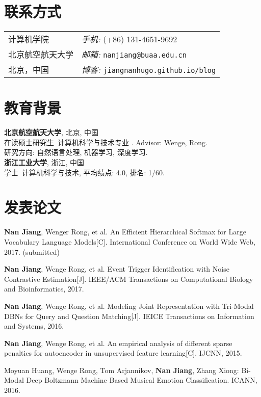 \documentclass[margin,line]{resume}
\begin{document}
\begin{resume}


\section{联系方式}
\begin{tabular}{@{}p{3in}p{3in}}
计算机学院 & {\it 手机:}  (+86) 131-4651-9692 \\
北京航空航天大学  & {\it 邮箱:}  {\tt nanjiang@buaa.edu.cn} \\
北京，中国         & {\it 博客:} {\tt jiangnanhugo.github.io/blog} \\
\end{tabular}


\section{教育背景}
{\bf 北京航空航天大学}, 北京,  中国\\
在读硕士研究生\ 计算机科学与技术专业 . Advisor:  Wenge, Rong.\\
研究方向: 自然语言处理, 机器学习, 深度学习. \\


{\bf 浙江工业大学}, 浙江, 中国\\
学士\ 计算机科学与技术, 平均绩点: 4.0, 排名: 1/60.


\section{发表论文}

\textbf{Nan Jiang}, Wenger Rong, et al. An Efficient Hierarchical Softmax for Large Vocabulary Language Models[C]. International Conference on World Wide Web, 2017. (submitted)

\textbf{Nan Jiang}, Wenge Rong, et al. Event Trigger Identification with Noise Contrastive Estimation[J]. IEEE/ACM Transactions on Computational Biology and Bioinformatics, 2017.

\textbf{Nan Jiang}, Wenge Rong, et al. Modeling Joint Representation with Tri-Modal DBNs for Query and Question Matching[J]. IEICE Transactions on Information and Systems, 2016.

\textbf{Nan Jiang}, Wenge Rong, et al. An empirical analysis of different sparse penalties for autoencoder in unsupervised feature learning[C]. IJCNN, 2015.

Moyuan Huang, Wenge Rong, Tom Arjannikov, \textbf{Nan Jiang}, Zhang Xiong: Bi-Modal Deep Boltzmann Machine Based Musical Emotion Classification. ICANN, 2016.





\end{resume}
\end{document}
